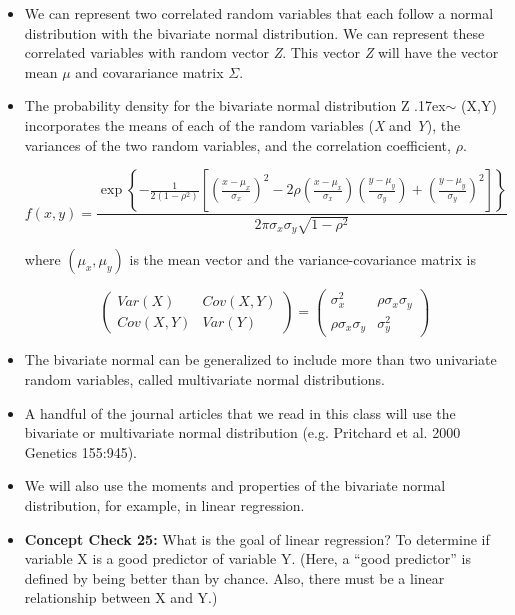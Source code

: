 \documentclass[12pt]{report}
\begin{document}
\begin{itemize}

\item We can represent two correlated random variables that each follow a normal distribution with the bivariate normal distribution. We can represent these correlated variables with random vector \textit{Z}. This vector \textit{Z} will have the vector mean $\mu$ and covarariance matrix $\Sigma$.

\item The probability density for the bivariate normal distribution Z {\raise.17ex\hbox{$\scriptstyle\sim$}} \big(X,Y\big) incorporates the means of each of the random variables (\textit{X} and \textit{Y}), the variances of the two random variables, and the correlation coefficient, $\rho$.

\[
f(x,y)=\frac{\exp \left\{ -\frac 1{2(1-\rho ^2)}\left[ \left( \frac{x-\mu _x%
}{\sigma _x}\right) ^2-2\rho \left( \frac{x-\mu _x}{\sigma _x}\right) \left( 
\frac{y-\mu _y}{\sigma _y}\right) +\left( \frac{y-\mu _y}{\sigma _y}\right)
^2\right] \right\} }{2\pi \sigma _x\sigma _y\sqrt{1-\rho ^2}} 
\]

where $(\mu _x,\mu _y)$ is the mean vector and the variance-covariance
matrix is

\[
\left( 
\begin{array}{cc}
Var(X) & Cov(X,Y) \\ 
Cov(X,Y) & Var(Y)
\end{array}
\right) =\left( 
\begin{array}{cc}
\sigma _x^2 & \rho \sigma _x\sigma _y \\ 
\rho \sigma _x\sigma _y & \sigma _y^2
\end{array}
\right) 
\]

\bigskip
\item The bivariate normal can be generalized to include more than two univariate random variables, called multivariate normal distributions. 

\item A handful of the journal articles that we read in this class will use the bivariate or multivariate normal distribution (e.g. Pritchard et al. 2000 Genetics 155:945). 

\item We will also use the moments and properties of the bivariate normal distribution, for example, in linear regression. 

\item \textbf{Concept Check 25:}  What is the goal of linear regression? \color{red} To determine if variable X is a good predictor of variable Y. (Here, a ``good predictor'' is defined by being better than by chance. Also, there must be a linear relationship between X and Y.) 
\color{black}


\end{itemize}
\end{document}
